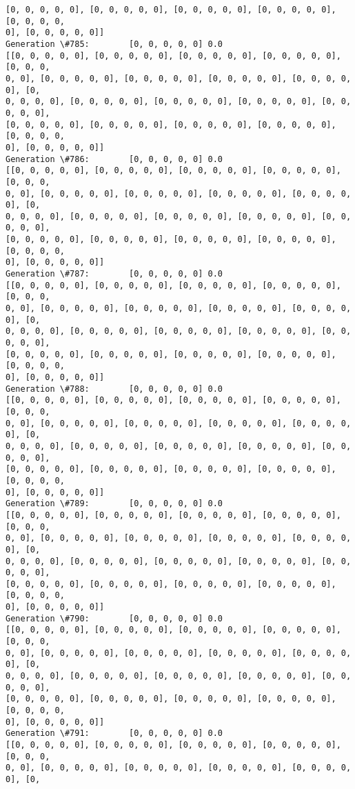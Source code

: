 \documentclass[11pt]{article}
\begin{document}
\begin{Verbatim}[commandchars=\\\{\}]
[0, 0, 0, 0, 0], [0, 0, 0, 0, 0], [0, 0, 0, 0, 0], [0, 0, 0, 0, 0], [0, 0, 0, 0,
0], [0, 0, 0, 0, 0]]
Generation \#785:        [0, 0, 0, 0, 0] 0.0
[[0, 0, 0, 0, 0], [0, 0, 0, 0, 0], [0, 0, 0, 0, 0], [0, 0, 0, 0, 0], [0, 0, 0,
0, 0], [0, 0, 0, 0, 0], [0, 0, 0, 0, 0], [0, 0, 0, 0, 0], [0, 0, 0, 0, 0], [0,
0, 0, 0, 0], [0, 0, 0, 0, 0], [0, 0, 0, 0, 0], [0, 0, 0, 0, 0], [0, 0, 0, 0, 0],
[0, 0, 0, 0, 0], [0, 0, 0, 0, 0], [0, 0, 0, 0, 0], [0, 0, 0, 0, 0], [0, 0, 0, 0,
0], [0, 0, 0, 0, 0]]
Generation \#786:        [0, 0, 0, 0, 0] 0.0
[[0, 0, 0, 0, 0], [0, 0, 0, 0, 0], [0, 0, 0, 0, 0], [0, 0, 0, 0, 0], [0, 0, 0,
0, 0], [0, 0, 0, 0, 0], [0, 0, 0, 0, 0], [0, 0, 0, 0, 0], [0, 0, 0, 0, 0], [0,
0, 0, 0, 0], [0, 0, 0, 0, 0], [0, 0, 0, 0, 0], [0, 0, 0, 0, 0], [0, 0, 0, 0, 0],
[0, 0, 0, 0, 0], [0, 0, 0, 0, 0], [0, 0, 0, 0, 0], [0, 0, 0, 0, 0], [0, 0, 0, 0,
0], [0, 0, 0, 0, 0]]
Generation \#787:        [0, 0, 0, 0, 0] 0.0
[[0, 0, 0, 0, 0], [0, 0, 0, 0, 0], [0, 0, 0, 0, 0], [0, 0, 0, 0, 0], [0, 0, 0,
0, 0], [0, 0, 0, 0, 0], [0, 0, 0, 0, 0], [0, 0, 0, 0, 0], [0, 0, 0, 0, 0], [0,
0, 0, 0, 0], [0, 0, 0, 0, 0], [0, 0, 0, 0, 0], [0, 0, 0, 0, 0], [0, 0, 0, 0, 0],
[0, 0, 0, 0, 0], [0, 0, 0, 0, 0], [0, 0, 0, 0, 0], [0, 0, 0, 0, 0], [0, 0, 0, 0,
0], [0, 0, 0, 0, 0]]
Generation \#788:        [0, 0, 0, 0, 0] 0.0
[[0, 0, 0, 0, 0], [0, 0, 0, 0, 0], [0, 0, 0, 0, 0], [0, 0, 0, 0, 0], [0, 0, 0,
0, 0], [0, 0, 0, 0, 0], [0, 0, 0, 0, 0], [0, 0, 0, 0, 0], [0, 0, 0, 0, 0], [0,
0, 0, 0, 0], [0, 0, 0, 0, 0], [0, 0, 0, 0, 0], [0, 0, 0, 0, 0], [0, 0, 0, 0, 0],
[0, 0, 0, 0, 0], [0, 0, 0, 0, 0], [0, 0, 0, 0, 0], [0, 0, 0, 0, 0], [0, 0, 0, 0,
0], [0, 0, 0, 0, 0]]
Generation \#789:        [0, 0, 0, 0, 0] 0.0
[[0, 0, 0, 0, 0], [0, 0, 0, 0, 0], [0, 0, 0, 0, 0], [0, 0, 0, 0, 0], [0, 0, 0,
0, 0], [0, 0, 0, 0, 0], [0, 0, 0, 0, 0], [0, 0, 0, 0, 0], [0, 0, 0, 0, 0], [0,
0, 0, 0, 0], [0, 0, 0, 0, 0], [0, 0, 0, 0, 0], [0, 0, 0, 0, 0], [0, 0, 0, 0, 0],
[0, 0, 0, 0, 0], [0, 0, 0, 0, 0], [0, 0, 0, 0, 0], [0, 0, 0, 0, 0], [0, 0, 0, 0,
0], [0, 0, 0, 0, 0]]
Generation \#790:        [0, 0, 0, 0, 0] 0.0
[[0, 0, 0, 0, 0], [0, 0, 0, 0, 0], [0, 0, 0, 0, 0], [0, 0, 0, 0, 0], [0, 0, 0,
0, 0], [0, 0, 0, 0, 0], [0, 0, 0, 0, 0], [0, 0, 0, 0, 0], [0, 0, 0, 0, 0], [0,
0, 0, 0, 0], [0, 0, 0, 0, 0], [0, 0, 0, 0, 0], [0, 0, 0, 0, 0], [0, 0, 0, 0, 0],
[0, 0, 0, 0, 0], [0, 0, 0, 0, 0], [0, 0, 0, 0, 0], [0, 0, 0, 0, 0], [0, 0, 0, 0,
0], [0, 0, 0, 0, 0]]
Generation \#791:        [0, 0, 0, 0, 0] 0.0
[[0, 0, 0, 0, 0], [0, 0, 0, 0, 0], [0, 0, 0, 0, 0], [0, 0, 0, 0, 0], [0, 0, 0,
0, 0], [0, 0, 0, 0, 0], [0, 0, 0, 0, 0], [0, 0, 0, 0, 0], [0, 0, 0, 0, 0], [0,

\end{Verbatim}
\end{document}

